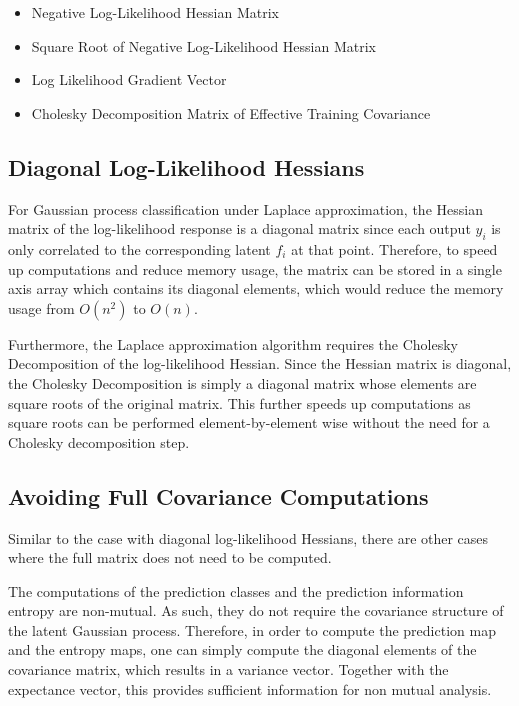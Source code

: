 			\begin{itemize}
				\item Negative Log-Likelihood Hessian Matrix
				\item Square Root of Negative Log-Likelihood Hessian Matrix
				\item Log Likelihood Gradient Vector
				\item Cholesky Decomposition Matrix of Effective Training Covariance
			\end{itemize}

		\subsection{Diagonal Log-Likelihood Hessians}
		\label{Appendix:ComputationalAspects:TimeSpaceComplexity:DiagonalHessians}
					
			For Gaussian process classification under Laplace approximation, the Hessian matrix of the log-likelihood response is a diagonal matrix since each output $y_{i}$ is only correlated to the corresponding latent $f_{i}$ at that point. Therefore, to speed up computations and reduce memory usage, the matrix can be stored in a single axis array which contains its diagonal elements, which would reduce the memory usage from $O(n^{2})$ to $O(n)$.
			
			Furthermore, the Laplace approximation algorithm requires the Cholesky Decomposition of the log-likelihood Hessian. Since the Hessian matrix is diagonal, the Cholesky Decomposition is simply a diagonal matrix whose elements are square roots of the original matrix. This further speeds up computations as square roots can be performed element-by-element wise without the need for a Cholesky decomposition step.
			
		\subsection{Avoiding Full Covariance Computations}
		\label{Appendix:ComputationalAspects:TimeSpaceComplexity:CovarianceAvoidance}
		
			Similar to the case with diagonal log-likelihood Hessians, there are other cases where the full matrix does not need to be computed. 
			
			The computations of the prediction classes and the prediction information entropy are non-mutual. As such, they do not require the covariance structure of the latent Gaussian process. Therefore, in order to compute the prediction map and the entropy maps, one can simply compute the diagonal elements of the covariance matrix, which results in a variance vector. Together with the expectance vector, this provides sufficient information for non mutual analysis.
			
